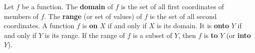 Let $f$ be a function. The \textbf{domain} of $f$ is the set of all first coordinates of members of $f$. The \textbf{range} (or set of values) of $f$ is the set of all second coordinates. A function $f$ is \textbf{on} $X$ if and only if $X$ is its domain. It is \textbf{onto} $Y$ if and only if $Y$ is its range. If the range of $f$ is a subset of $Y$, then $f$ is \textbf{to} $Y$ (or \textbf{into} $Y$).
